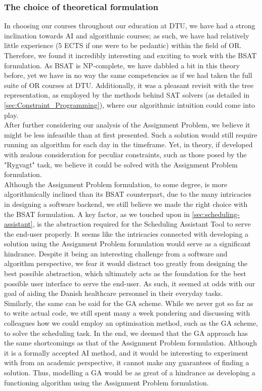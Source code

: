 \subsubsection*{The choice of theoretical formulation}
In choosing our courses throughout our education at DTU, we have had a strong inclination towards AI and algorithmic courses; as such, we have had relatively little experience (5 ECTS if one were to be pedantic) within the field of OR. Therefore, we found it incredibly interesting and exciting to work with the BSAT formulation. As BSAT is NP-complete, we have dabbled a bit in this theory before, yet we have in no way the same competencies as if we had taken the full suite of OR courses at DTU. Additionally, it was a pleasant revisit with the tree representation, as employed by the methods behind SAT solvers (as detailed in \autoref{sec:Constraint_Programming}), where our algorithmic intuition could come into play.
\\
After further considering our analysis of the Assignment Problem, we believe it might be less infeasible than at first presented. Such a solution would still require running an algorithm for each day in the timeframe. Yet, in theory, if developed with zealous consideration for peculiar constraints, such as those posed by the "Rygvagt" task, we believe it could be solved with the Assignment Problem formulation.
\\
Although the Assignment Problem formulation, to some degree, is more algorithmically inclined than its BSAT counterpart, due to the many intricacies in designing a software backend, we still believe we made the right choice with the BSAT formulation. A key factor, as we touched upon in \autoref{sec:scheduling-assistant}, is the abstraction required for the Scheduling Assistant Tool to serve the end-user properly. It seems like the intricacies connected with developing a solution using the Assignment Problem formulation would serve as a significant hindrance. Despite it being an interesting challenge from a software and algorithm perspective, we fear it would distract too greatly from designing the best possible abstraction, which ultimately acts as the foundation for the best possible user interface to serve the end-user. As such, it seemed at odds with our goal of aiding the Danish healthcare personnel in their everyday tasks.
\\
Similarly, the same can be said for the GA scheme. While we never got so far as to write actual code, we still spent many a week pondering and discussing with colleagues how we could employ an optimisation method, such as the GA scheme, to solve the scheduling task. In the end, we deemed that the GA approach has the same shortcomings as that of the Assignment Problem formulation. Although it is a formally accepted AI method, and it would be interesting to experiment with from an academic perspective, it cannot make any guarantees of finding a solution. Thus, modelling a GA would be as great of a hindrance as developing a functioning algorithm using the Assignment Problem formulation.

